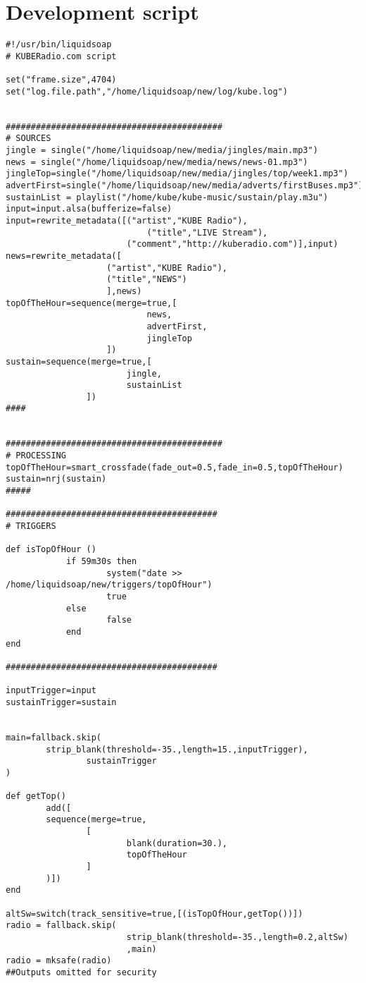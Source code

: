 \section{Development script}
\begin{verbatim}
#!/usr/bin/liquidsoap
# KUBERadio.com script

set("frame.size",4704)
set("log.file.path","/home/liquidsoap/new/log/kube.log")


###########################################
# SOURCES
jingle = single("/home/liquidsoap/new/media/jingles/main.mp3")
news = single("/home/liquidsoap/new/media/news/news-01.mp3")
jingleTop=single("/home/liquidsoap/new/media/jingles/top/week1.mp3")
advertFirst=single("/home/liquidsoap/new/media/adverts/firstBuses.mp3")
sustainList = playlist("/home/kube/kube-music/sustain/play.m3u")
input=input.alsa(bufferize=false)
input=rewrite_metadata([("artist","KUBE Radio"),
                            ("title","LIVE Stream"),
                        ("comment","http://kuberadio.com")],input)
news=rewrite_metadata([
                    ("artist","KUBE Radio"),
                    ("title","NEWS")
                    ],news)
topOfTheHour=sequence(merge=true,[
                            news,
                            advertFirst,
                            jingleTop
                    ])
sustain=sequence(merge=true,[
                        jingle,
                        sustainList
                ])
####


###########################################
# PROCESSING
topOfTheHour=smart_crossfade(fade_out=0.5,fade_in=0.5,topOfTheHour)
sustain=nrj(sustain)
#####

##########################################
# TRIGGERS

def isTopOfHour ()
            if 59m30s then
                    system("date >> /home/liquidsoap/new/triggers/topOfHour")
                    true
            else
                    false
            end
end

##########################################

inputTrigger=input
sustainTrigger=sustain


main=fallback.skip(
        strip_blank(threshold=-35.,length=15.,inputTrigger),
                sustainTrigger
)

def getTop()
        add([
        sequence(merge=true,
                [
                        blank(duration=30.),
                        topOfTheHour
                ]       
        )])
end

altSw=switch(track_sensitive=true,[(isTopOfHour,getTop())])
radio = fallback.skip(
                        strip_blank(threshold=-35.,length=0.2,altSw)
                        ,main)
radio = mksafe(radio)
##Outputs omitted for security
\end{verbatim}

